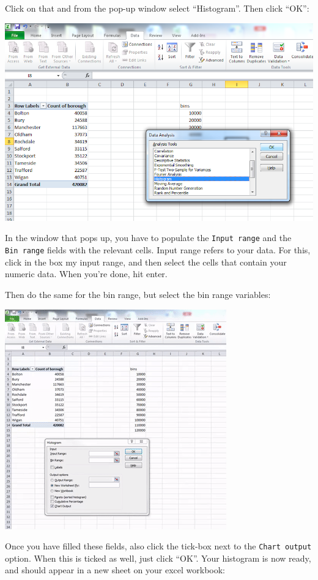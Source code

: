 \documentclass[
]{book}
\begin{document}
Click on that and from the pop-up window select ``Histogram''. Then click ``OK'':

\includegraphics{imgs/dat_pick_hist.png}

In the window that pops up, you have to populate the \texttt{Input\ range} and the \texttt{Bin\ range} fields with the relevant cells. Input range refers to your data. For this, click in the box my input range, and then select the cells that contain your numeric data. When you're done, hit enter.

Then do the same for the bin range, but select the bin range variables:

\includegraphics{imgs/build_histo.gif}

Once you have filled these fields, also click the tick-box next to the \texttt{Chart\ output} option. When this is ticked as well, just click ``OK''. Your histogram is now ready, and should appear in a new sheet on your excel workbook:
\end{document}
